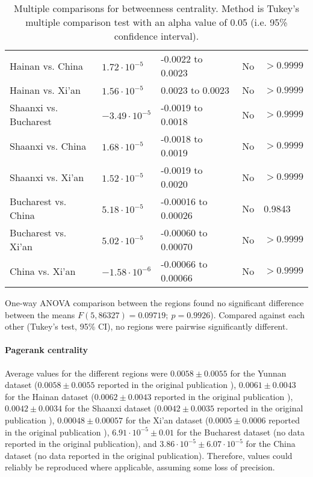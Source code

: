 \begin{table}[htbp]
\begin{mdframed}
\begin{tabular*}{\linewidth}{l|llll}
			Hainan vs. China & $1.72\cdot 10^{-5}$ & -0.0022 to 0.0023 & No & $>0.9999$\\
			Hainan vs. Xi'an & $1.56\cdot 10^{-5}$ & 0.0023 to 0.0023 & No & $>0.9999$\\
			Shaanxi vs. Bucharest & $-3.49\cdot 10^{-5}$ & -0.0019 to 0.0018 & No & $>0.9999$\\
			Shaanxi vs. China & $1.68\cdot 10^{-5}$ & -0.0018 to 0.0019 & No & $>0.9999$\\
			Shaanxi vs. Xi'an & $1.52\cdot 10^{-5}$ & -0.0019 to 0.0020 & No & $>0.9999$\\
			Bucharest vs. China & $5.18\cdot 10^{-5}$ & -0.00016 to 0.00026 & No & 0.9843\\
			Bucharest vs. Xi'an & $5.02\cdot 10^{-5}$ & -0.00060 to 0.00070 & No & $>0.9999$\\
			China vs. Xi'an & $-1.58\cdot 10^{-6}$ & -0.00066 to 0.00066 & No & $>0.9999$\\
			\hline
		\end{tabular*}
		\caption{Multiple comparisons for betweenness centrality. Method is Tukey's multiple comparison test with an alpha value of 0.05 (i.e. 95\% confidence interval).}
		\label{tab:betweenness_centrality_tukey}
	\end{mdframed}
\end{table}

One-way ANOVA comparison between the regions found no significant difference between the means $F(5,86327) = 0.09719; \: p=0.9926$). Compared against each other (Tukey's test, 95\% CI), no regions were pairwise significantly different.

\paragraph{Pagerank centrality} Average values for the different regions were $0.0058\pm0.0055$ for the Yunnan dataset ($0.0058\pm0.0055$ reported in the original publication \cite{hainan_publication}), $0.0061\pm0.0043$ for the Hainan dataset ($0.0062\pm0.0043$ reported in the original publication \cite{hainan_publication}), $0.0042\pm0.0034$ for the Shaanxi dataset ($0.0042\pm0.0035$ reported in the original publication \cite{shaanxi_publication}), $0.00048\pm0.00057$ for the Xi'an dataset ($0.0005\pm0.0006$ reported in the original publication \cite{xian_publication}), $6.91\cdot 10^{-5}\pm0.01$ for the Bucharest dataset (no data reported in the original publication), and $3.86\cdot 10^{-5}\pm6.07\cdot 10^{-5}$ for the China dataset (no data reported in the original publication). Therefore, values could reliably be reproduced where applicable, assuming some loss of precision.

